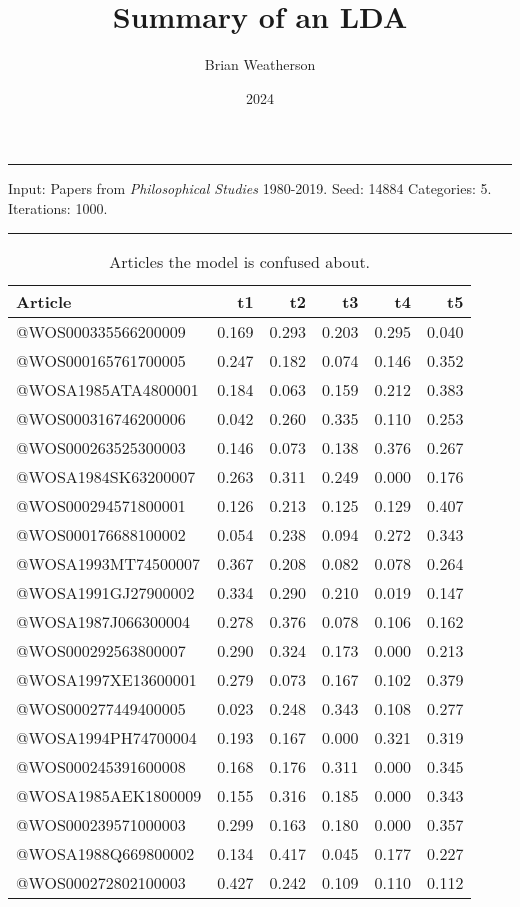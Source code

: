 \documentclass[
  10pt,
  letterpaper,
  DIV=11,
  numbers=noendperiod,
  twoside]{scrartcl}
\title{Summary of an LDA}
\author{Brian Weatherson}
\date{2024}
\renewenvironment{abstract}
 {\vspace{-1.25cm}
 \quotation\small\noindent\rule{\linewidth}{.5pt}\par\smallskip
 \noindent }
 {\par\noindent\rule{\linewidth}{.5pt}\endquotation}
\begin{document}
\maketitle
\begin{abstract}
Input: Papers from \emph{Philosophical Studies} 1980-2019. Seed: 14884
Categories: 5. Iterations: 1000.
\end{abstract}

\begin{longtable}[]{@{}lrrrrr@{}}

\caption{\label{tbl-confusing}Articles the model is confused about.}

\tabularnewline

\toprule\noalign{}
Article & t1 & t2 & t3 & t4 & t5 \\
\midrule\noalign{}
\endhead
\bottomrule\noalign{}
\endlastfoot
@WOS000335566200009 & 0.169 & 0.293 & 0.203 & 0.295 & 0.040 \\
@WOS000165761700005 & 0.247 & 0.182 & 0.074 & 0.146 & 0.352 \\
@WOSA1985ATA4800001 & 0.184 & 0.063 & 0.159 & 0.212 & 0.383 \\
@WOS000316746200006 & 0.042 & 0.260 & 0.335 & 0.110 & 0.253 \\
@WOS000263525300003 & 0.146 & 0.073 & 0.138 & 0.376 & 0.267 \\
@WOSA1984SK63200007 & 0.263 & 0.311 & 0.249 & 0.000 & 0.176 \\
@WOS000294571800001 & 0.126 & 0.213 & 0.125 & 0.129 & 0.407 \\
@WOS000176688100002 & 0.054 & 0.238 & 0.094 & 0.272 & 0.343 \\
@WOSA1993MT74500007 & 0.367 & 0.208 & 0.082 & 0.078 & 0.264 \\
@WOSA1991GJ27900002 & 0.334 & 0.290 & 0.210 & 0.019 & 0.147 \\
@WOSA1987J066300004 & 0.278 & 0.376 & 0.078 & 0.106 & 0.162 \\
@WOS000292563800007 & 0.290 & 0.324 & 0.173 & 0.000 & 0.213 \\
@WOSA1997XE13600001 & 0.279 & 0.073 & 0.167 & 0.102 & 0.379 \\
@WOS000277449400005 & 0.023 & 0.248 & 0.343 & 0.108 & 0.277 \\
@WOSA1994PH74700004 & 0.193 & 0.167 & 0.000 & 0.321 & 0.319 \\
@WOS000245391600008 & 0.168 & 0.176 & 0.311 & 0.000 & 0.345 \\
@WOSA1985AEK1800009 & 0.155 & 0.316 & 0.185 & 0.000 & 0.343 \\
@WOS000239571000003 & 0.299 & 0.163 & 0.180 & 0.000 & 0.357 \\
@WOSA1988Q669800002 & 0.134 & 0.417 & 0.045 & 0.177 & 0.227 \\
@WOS000272802100003 & 0.427 & 0.242 & 0.109 & 0.110 & 0.112 \\

\end{longtable}
\end{document}
